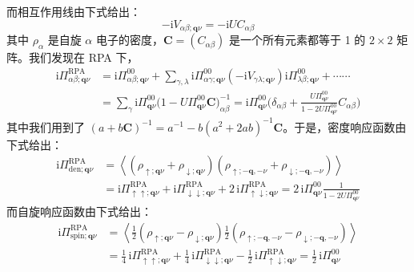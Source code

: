 而相互作用线由下式给出：
\begin{equation*}
-\mathrm{i}V_{\alpha\beta;\pmb{q}\nu}=-\mathrm{i}UC_{\alpha\beta}
\end{equation*}
其中 $\rho_{\alpha}$ 是自旋 $\alpha$ 电子的密度，$\pmb{C}=(C_{\alpha\beta})$ 是一个所有元素都等于 1 的 $2\times 2$ 矩阵。我们发现在 RPA 下，
\begin{align*}
\mathrm{i}\Pi^{\mathrm{RPA}}_{\alpha\beta;\pmb{q}\nu}&=\mathrm{i}\Pi^{00}_{\alpha\beta;\pmb{q}\nu}+\sum_{\gamma,\lambda}\mathrm{i}\Pi^{00}_{\alpha\gamma;\pmb{q}\nu}(-\mathrm{i}V_{\gamma\lambda;\pmb{q}\nu})\mathrm{i}\Pi^{00}_{\lambda\beta;\pmb{q}\nu}+\cdots\cdots\\
&=\sum_{\gamma}\mathrm{i}\Pi^{00}_{\pmb{q}\nu}\big(1-U\Pi^{00}_{\pmb{q}\nu}\pmb{C}\big)^{-1}_{\alpha\beta}=\mathrm{i}\Pi^{00}_{\pmb{q}\nu}\Big(\delta_{\alpha\beta}+\frac{U\Pi^{00}_{\pmb{q}\nu}}{1-2U\Pi^{00}_{\pmb{q}\nu}}C_{\alpha\beta}\Big)
\end{align*}
其中我们用到了 $(a+b\pmb{C})^{-1}=a^{-1}-b(a^{2}+2ab)^{-1}\pmb{C}$。于是，密度响应函数由下式给出：
\begin{align*}
\mathrm{i}\Pi^{\mathrm{RPA}}_{\mathrm{den};\pmb{q}\nu}&=\left\langle (\rho_{\uparrow;\pmb{q}\nu}+\rho_{\downarrow;\pmb{q}\nu})(\rho_{\uparrow;-\pmb{q},-\nu}+\rho_{\downarrow;-\pmb{q},-\nu})\right\rangle\\
&=\mathrm{i}\Pi^{\mathrm{RPA}}_{\uparrow\uparrow;\pmb{q}\nu}+\mathrm{i}\Pi^{\mathrm{RPA}}_{\downarrow\downarrow;\pmb{q}\nu}+2\,\mathrm{i}\Pi^{\mathrm{RPA}}_{\uparrow\downarrow;\pmb{q}\nu}=2\,\mathrm{i}\Pi^{00}_{\pmb{q}\nu}\frac{1}{1-2U\Pi^{00}_{\pmb{q}\nu}}
\end{align*}
而自旋响应函数由下式给出：
\begin{align*}
\mathrm{i}\Pi^{\mathrm{RPA}}_{\mathrm{spin};\pmb{q}\nu}&=\left\langle \frac{1}{2}(\rho_{\uparrow;\pmb{q}\nu}-\rho_{\downarrow;\pmb{q}\nu})\frac{1}{2}(\rho_{\uparrow;-\pmb{q},-\nu}-\rho_{\downarrow;-\pmb{q},-\nu})\right\rangle\\
&=\frac{1}{4}\,\mathrm{i}\Pi^{\mathrm{RPA}}_{\uparrow\uparrow;\pmb{q}\nu}+\frac{1}{4}\,\mathrm{i}\Pi^{\mathrm{RPA}}_{\downarrow\downarrow;\pmb{q}\nu}-\frac{1}{2}\,\mathrm{i}\Pi^{\mathrm{RPA}}_{\uparrow\downarrow;\pmb{q}\nu}=\frac{1}{2}\,\mathrm{i}\Pi^{00}_{\pmb{q}\nu}
\end{align*}

